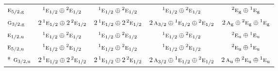 \documentclass[10pt,a4paper]{article}
\numberwithin{equation}{section}
\newcommand{\irr}[1]{\text{\normalfont\scshape #1}}
\newcommand{\conjpair}[1]{{}^{#1}}
\newcommand{\ptag}[1]{\mathrm{#1}}
\begin{document}
{\begin{longtable}{@{}lcccc@{}}
$\irr{e}_{5/2,\ptag{g}}$ & $\conjpair{1}\irr{e}_{1/2}\oplus \conjpair{2}\irr{e}_{1/2}$ & $\conjpair{1}\irr{e}_{1/2}\oplus \conjpair{2}\irr{e}_{1/2}$ & $\conjpair{1}\irr{e}_{1/2}\oplus \conjpair{2}\irr{e}_{1/2}$ & $\conjpair{2}\irr{e}_{\ptag{g}}\oplus \conjpair{1}\irr{e}_{\ptag{g}}$\\
$\irr{g}_{3/2,\ptag{g}}$ & $2\,\conjpair{1}\irr{e}_{1/2}\oplus 2\,\conjpair{2}\irr{e}_{1/2}$ & $2\,\conjpair{1}\irr{e}_{1/2}\oplus 2\,\conjpair{2}\irr{e}_{1/2}$ & $2\,\irr{a}_{3/2}\oplus \conjpair{1}\irr{e}_{1/2}\oplus \conjpair{2}\irr{e}_{1/2}$ & $2\,\irr{a}_{\ptag{g}}\oplus \conjpair{2}\irr{e}_{\ptag{g}}\oplus \conjpair{1}\irr{e}_{\ptag{g}}$\\
$\irr{e}_{1/2,\ptag{u}}$ & $\conjpair{1}\irr{e}_{1/2}\oplus \conjpair{2}\irr{e}_{1/2}$ & $\conjpair{1}\irr{e}_{1/2}\oplus \conjpair{2}\irr{e}_{1/2}$ & $\conjpair{1}\irr{e}_{1/2}\oplus \conjpair{2}\irr{e}_{1/2}$ & $\conjpair{2}\irr{e}_{\ptag{u}}\oplus \conjpair{1}\irr{e}_{\ptag{u}}$\\
$\irr{e}_{5/2,\ptag{u}}$ & $\conjpair{1}\irr{e}_{1/2}\oplus \conjpair{2}\irr{e}_{1/2}$ & $\conjpair{1}\irr{e}_{1/2}\oplus \conjpair{2}\irr{e}_{1/2}$ & $\conjpair{1}\irr{e}_{1/2}\oplus \conjpair{2}\irr{e}_{1/2}$ & $\conjpair{2}\irr{e}_{\ptag{u}}\oplus \conjpair{1}\irr{e}_{\ptag{u}}$\\*
$\irr{g}_{3/2,\ptag{u}}$ & $2\,\conjpair{1}\irr{e}_{1/2}\oplus 2\,\conjpair{2}\irr{e}_{1/2}$ & $2\,\conjpair{1}\irr{e}_{1/2}\oplus 2\,\conjpair{2}\irr{e}_{1/2}$ & $2\,\irr{a}_{3/2}\oplus \conjpair{1}\irr{e}_{1/2}\oplus \conjpair{2}\irr{e}_{1/2}$ & $2\,\irr{a}_{\ptag{u}}\oplus \conjpair{2}\irr{e}_{\ptag{u}}\oplus \conjpair{1}\irr{e}_{\ptag{u}}$\\
\bottomrule\end{longtable}}
\end{document}
